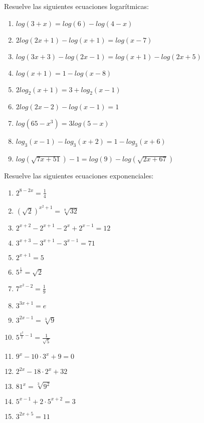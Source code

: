 \Exercicio Resuelve las siguientes ecuaciones logarítmicas:

\begin{enumerate}[topsep=0pt]
	\item $ log(3+x) = log (6) -log(4-x) $
	\item $ 2 log(2x+1) - log(x+1) = log(x-7)$
	\item $ log(3x+3) - log(2x-1) = log(x+1) - log(2x+5)$
	\item $ log(x+1) = 1 - log(x-8)$
	\item $ 2log_2(x+1) = 3 + log_2(x-1)$
	\item $ 2log(2x-2)-log(x-1) = 1$
	\item $ log(65-x^3)= 3log(5-x)$
	\item $ log_3(x-1) - log_3 (x+2) = 1 - log_3(x+6)$
	\item $ log(\sqrt{7x+51}) -1 = log(9) - log(\sqrt{2x+67})$
\end{enumerate}

\Exercicio Resuelve las siguientes ecuaciones exponenciales:

\begin{enumerate}[topsep=0pt]
	\item $ 2^{8-2x} = \frac{1}{4} $
	\item $ (\sqrt{2})^{x^2+1} = \sqrt[8]{32}$
	\item $ 2^{x+2} - 2^{x+1} - 2^x + 2^{x-1} = 12$
	\item $ 3^{x+3} - 3^{x+1} - 3^{x-1} = 71 $
	\item $ 2^{x+1} = 5 $
	\item $ 5^{\frac{1}{x}} = \sqrt{2} $
	\item $ 7^{x^2-2} = \frac{1}{9}$
	\item $ 3^{3x+1} = e$
	\item $ 3^{2x-1} = \sqrt[3]{9}$
	\item $ 5^{\frac{x^2}{2}-1} = \frac{1}{\sqrt{5}}$
	\item $ 9^x - 10 \cdot 3^x + 9 = 0$
	\item $ 2^{2x} - 18 \cdot 2^x + 32$
	\item $ 81^x = \sqrt[3]{9^2}$
	\item $ 5^{x-1} + 2 \cdot 5^{x+2} = 3$
	\item $ 3^{2x+5} = 11$
\end{enumerate}

